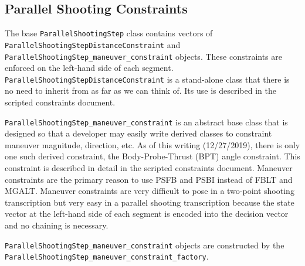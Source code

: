 \subsection{Parallel Shooting Constraints}
\label{subsec:parallel_shooting_constraints}

The base \texttt{ParallelShootingStep} class contains vectors of \texttt{ParallelShootingStepDistanceConstraint} and \texttt{ParallelShootingStep\_maneuver\_constraint} objects. These constraints are enforced on the left-hand side of each segment. \texttt{ParallelShootingStepDistanceConstraint} is a stand-alone class that there is no need to inherit from as far as we can think of. Its use is described in the scripted constraints document.

\texttt{ParallelShootingStep\_maneuver\_constraint} is an abstract base class that is designed so that a developer may easily write derived classes to constraint maneuver magnitude, direction, etc. As of this writing (12/27/2019), there is only one such derived constraint, the Body-Probe-Thrust (BPT) angle constraint. This constraint is described in detail in the scripted constraints document. Maneuver constraints are the primary reason to use \ac{PSFB} and \ac{PSBI} instead of \ac{FBLT} and \ac{MGALT}. Maneuver constraints are very difficult to pose in a two-point shooting transcription but very easy in a parallel shooting transcription because the state vector at the left-hand side of each segment is encoded into the decision vector and no chaining is necessary.

\texttt{ParallelShootingStep\_maneuver\_constraint} objects are constructed by the \texttt{ParallelShootingStep\_maneuver\_constraint\_factory}.

	
\endinput